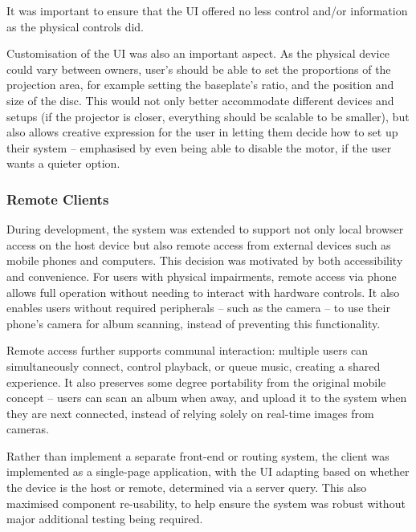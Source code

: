             It was important to ensure that the UI offered no less control and/or information as the physical controls did.
    
            Customisation of the UI was also an important aspect. As the physical device could vary between owners, user's should be able to set the proportions of the projection area, for example setting the baseplate's ratio, and the position and size of the disc. This would not only better accommodate different devices and setups (if the projector is closer, everything should be scalable to be smaller), but also allows creative expression for the user in letting them decide how to set up their system -- emphasised by even being able to disable the motor, if the user wants a quieter option.
        
            \subsubsection{Remote Clients}
    
                During development, the system was extended to support not only local browser access on the host device but also remote access from external devices such as mobile phones and computers. This decision was motivated by both accessibility and convenience. For users with physical impairments, remote access via phone allows full operation without needing to interact with hardware controls. It also enables users without required peripherals -- such as the camera -- to use their phone’s camera for album scanning, instead of preventing this functionality.
    
                Remote access further supports communal interaction: multiple users can simultaneously connect, control playback, or queue music, creating a shared experience. It also preserves some degree portability from the original mobile concept -- users can scan an album when away, and upload it to the system when they are next connected, instead of relying solely on real-time images from cameras.
                
                Rather than implement a separate front-end or routing system, the client was implemented as a single-page application, with the UI adapting based on whether the device is the host or remote, determined via a server query. This also maximised component re-usability, to help ensure the system was robust without major additional testing being required.
    
